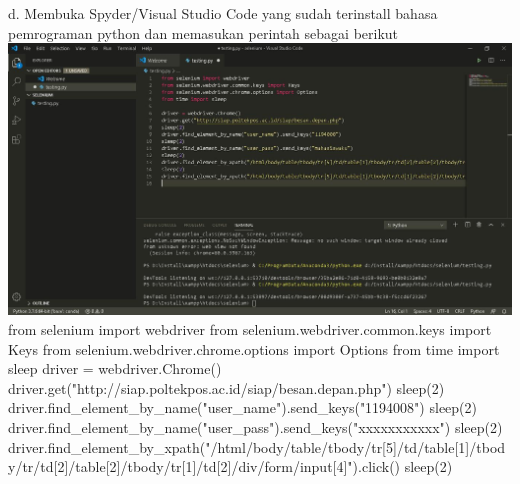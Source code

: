 \documentclass{article}
\begin{document}
\begin{enumerate}
            \newline
        	d. Membuka Spyder/Visual Studio Code yang sudah terinstall bahasa pemrograman python dan memasukan perintah sebagai berikut
        	\newline
            \includegraphics[scale=0.3]{33.1d.jpg}
            \newline
            from selenium import webdriver
            \newline
            from selenium.webdriver.common.keys import Keys
            \newline
            from selenium.webdriver.chrome.options import Options
            \newline
            from time import sleep
            \newline
            \newline
            driver = webdriver.Chrome()
            \newline
            driver.get("http://siap.poltekpos.ac.id/siap/besan.depan.php")
            \newline
            sleep(2)
            \newline
            driver.find\_element\_by\_name("user\_name").send\_keys("1194008")
            \newline
            sleep(2)
            \newline
            driver.find\_element\_by\_name("user\_pass").send\_keys("xxxxxxxxxxx")
            \newline
            sleep(2)
            \newline
            driver.find\_element\_by\_xpath("/html/body/table/tbody/tr[5]/td/table[1]/tbody/tr/td[2]/table[2]/tbody/tr[1]/td[2]/div/form/input[4]").click()
            \newline
            sleep(2)
            \newline

\end{enumerate}
\end{document}
